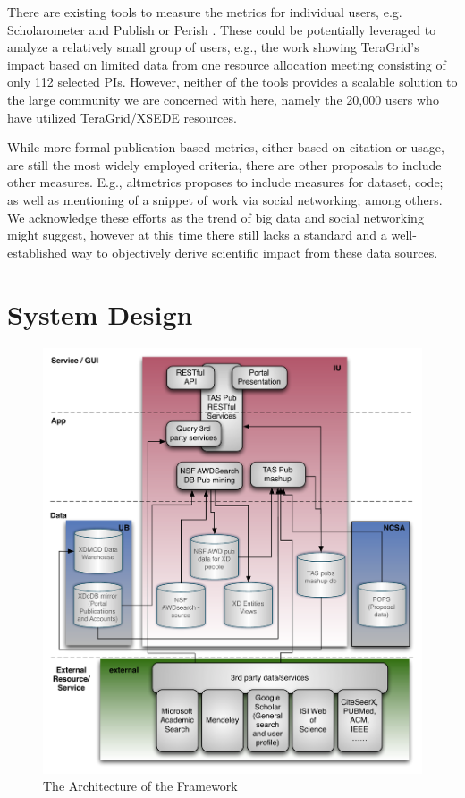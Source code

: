 \documentclass{sig-alternate}
\begin{document}
There are existing tools to measure the metrics for individual users, e.g. Scholarometer \cite{kaur2012scholarometer} and Publish or Perish \cite{www-pop}. These could be potentially leveraged to analyze a relatively small group of users, e.g., the work \cite{bollen2011and} showing TeraGrid's impact based on limited data from one resource allocation meeting consisting of  only 112 selected PIs. 
However, neither of the tools provides a scalable solution to the large community we are concerned with here, namely the 20,000 users who have utilized TeraGrid/XSEDE resources.  
 
While more formal publication based metrics, either based on citation or usage, are still the most widely employed criteria, there are other proposals to include other measures. E.g., altmetrics \cite{www-altmetrics} proposes to include measures for dataset, code; as well as mentioning of a snippet of work via social networking; among others. We acknowledge these efforts as the trend of big data and social networking might suggest, however at this time there still lacks a standard and a well-established way to objectively derive scientific impact from these data sources. 
 
 
% 
 
% 
 
\section{System Design} \label{S:design}
 
\begin{figure}[!htb] 
  \centering 
    \includegraphics[width=1.0\columnwidth]{images/tas-arch.pdf} 
  \caption{The Architecture of the Framework}\label{F:tas-arch} 
\end{figure} 
\end{document}

